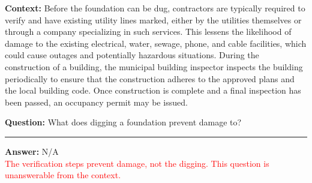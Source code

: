 \begin{tcolorbox}[colback=gray!3, colframe=gray!50, arc=2mm, boxrule=0.5pt, title={\textit{SQuAD2.0}}, coltitle=black, colbacktitle=gray!20]
    
   \textbf{Context:} Before the foundation can be dug, contractors are typically required to verify and have existing utility lines marked, either by the utilities themselves or through a company specializing in such services. This lessens the likelihood of damage to the existing electrical, water, sewage, phone, and cable facilities, which could cause outages and potentially hazardous situations. During the construction of a building, the municipal building inspector inspects the building periodically to ensure that the construction adheres to the approved plans and the local building code. Once construction is complete and a final inspection has been passed, an occupancy permit may be issued.

\textbf{Question:} What does digging a foundation prevent damage to?

    \noindent
    \begin{center}
        \rule{0.9\textwidth}{0.4pt}
    \end{center}
    
    \textbf{Answer:} N/A \\
    \textcolor{red}{The verification steps prevent damage, not the digging. This question is unanswerable from the context.}

    \medskip


\end{tcolorbox}
